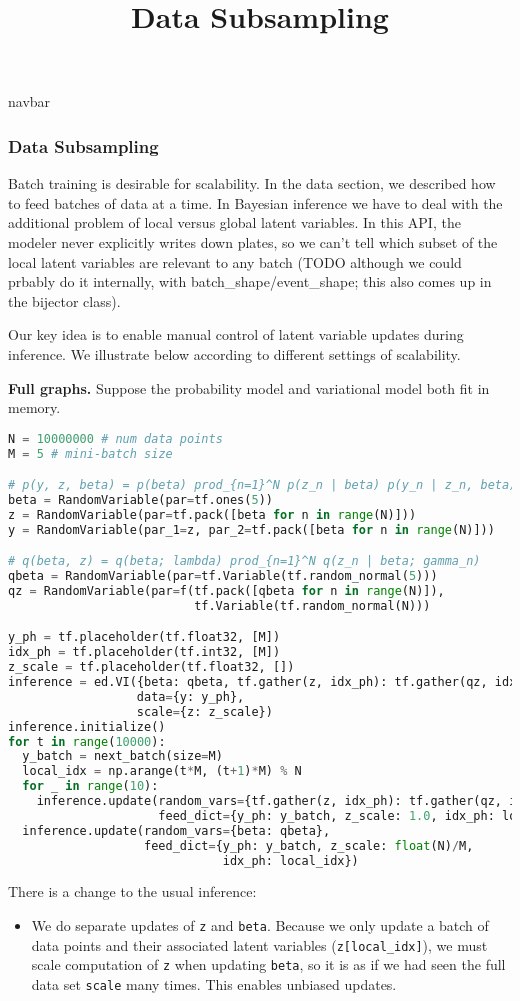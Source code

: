 \title{Data Subsampling}

{{navbar}}

\subsubsection{Data Subsampling}

Batch training is desirable for scalability. In the data section, we
described how to feed batches of data at a time.  In Bayesian
inference we have to deal with the additional problem of local versus
global latent variables.  In this API, the modeler never explicitly
writes down plates, so we can't tell which subset of the local latent
variables are relevant to any batch (TODO although we could prbably do
it internally, with batch\_shape/event\_shape; this also comes up in the
bijector class).

Our key idea is to enable manual control of latent variable updates
during inference. We illustrate below according to different settings
of scalability.

\textbf{Full graphs.}
Suppose the probability model and variational model both fit in
memory.
\begin{lstlisting}[language=Python]
N = 10000000 # num data points
M = 5 # mini-batch size

# p(y, z, beta) = p(beta) prod_{n=1}^N p(z_n | beta) p(y_n | z_n, beta)
beta = RandomVariable(par=tf.ones(5))
z = RandomVariable(par=tf.pack([beta for n in range(N)]))
y = RandomVariable(par_1=z, par_2=tf.pack([beta for n in range(N)]))

# q(beta, z) = q(beta; lambda) prod_{n=1}^N q(z_n | beta; gamma_n)
qbeta = RandomVariable(par=tf.Variable(tf.random_normal(5)))
qz = RandomVariable(par=f(tf.pack([qbeta for n in range(N)]),
                          tf.Variable(tf.random_normal(N)))

y_ph = tf.placeholder(tf.float32, [M])
idx_ph = tf.placeholder(tf.int32, [M])
z_scale = tf.placeholder(tf.float32, [])
inference = ed.VI({beta: qbeta, tf.gather(z, idx_ph): tf.gather(qz, idx_ph)},
                  data={y: y_ph},
                  scale={z: z_scale})
inference.initialize()
for t in range(10000):
  y_batch = next_batch(size=M)
  local_idx = np.arange(t*M, (t+1)*M) % N
  for _ in range(10):
    inference.update(random_vars={tf.gather(z, idx_ph): tf.gather(qz, idx_ph)},
                     feed_dict={y_ph: y_batch, z_scale: 1.0, idx_ph: local_idx})
  inference.update(random_vars={beta: qbeta},
                   feed_dict={y_ph: y_batch, z_scale: float(N)/M,
                              idx_ph: local_idx})
\end{lstlisting}
There is a change to the usual inference:
\begin{itemize}
\item
  We do separate updates of \texttt{z} and \texttt{beta}. Because we only update a
  batch of data points and their associated latent variables
  (\texttt{z[local_idx]}), we must scale computation of \texttt{z} when updating
  \texttt{beta}, so it is as if we had seen the full data set \texttt{scale} many
  times. This enables unbiased updates.
\end{itemize}

